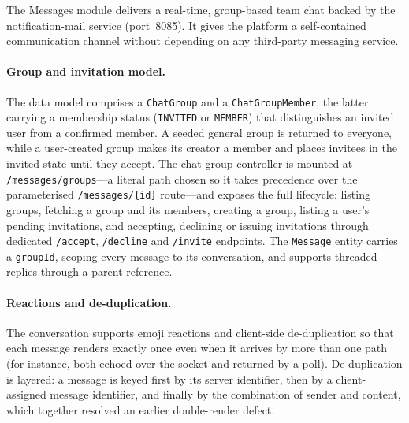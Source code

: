 The Messages module delivers a real-time, group-based team chat backed by the notification-mail service
(port~8085). It gives the platform a self-contained communication channel without depending on any third-party
messaging service.

\paragraph{Group and invitation model.} The data model comprises a \texttt{ChatGroup} and a
\texttt{ChatGroupMember}, the latter carrying a membership status (\texttt{INVITED} or \texttt{MEMBER}) that
distinguishes an invited user from a confirmed member. A seeded general group is returned to everyone, while a
user-created group makes its creator a member and places invitees in the invited state until they accept. The chat
group controller is mounted at \texttt{/messages/groups}---a literal path chosen so it takes precedence over the
parameterised \texttt{/messages/\{id\}} route---and exposes the full lifecycle: listing groups, fetching a group and
its members, creating a group, listing a user's pending invitations, and accepting, declining or issuing invitations
through dedicated \texttt{/accept}, \texttt{/decline} and \texttt{/invite} endpoints. The \texttt{Message} entity
carries a \texttt{groupId}, scoping every message to its conversation, and supports threaded replies through a parent
reference.

\paragraph{Reactions and de-duplication.} The conversation supports emoji reactions and client-side de-duplication so
that each message renders exactly once even when it arrives by more than one path (for instance, both echoed over the
socket and returned by a poll). De-duplication is layered: a message is keyed first by its server identifier, then by a
client-assigned message identifier, and finally by the combination of sender and content, which together resolved an
earlier double-render defect.

